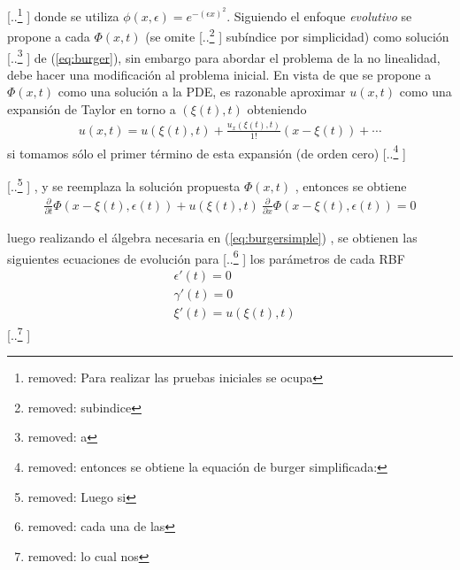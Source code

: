 \documentclass[spanish]{article} %
\providecommand{\DIFaddtex}[1]{{\protect\color{blue} \sf #1}} %
\providecommand{\DIFdeltex}[1]{{\protect\color{red} [..\footnote{removed: #1} ]}} %
\providecommand{\DIFaddbegin}{} %
\providecommand{\DIFaddend}{} %
\providecommand{\DIFdelbegin}{} %
\providecommand{\DIFdelend}{} %
\providecommand{\DIFadd}[1]{\texorpdfstring{\DIFaddtex{#1}}{#1}} %
\providecommand{\DIFdel}[1]{\texorpdfstring{\DIFdeltex{#1}}{}} %
\begin{document}
    \DIFdelbegin \DIFdel{Para realizar las pruebas iniciales se ocupa }\DIFdelend \DIFaddbegin \noindent \DIFadd{donde se utiliza }\DIFaddend $\displaystyle \phi(x,\epsilon) = e^{-(\epsilon x)^2}$. Siguiendo el enfoque \textit{evolutivo} se propone \DIFaddbegin \DIFadd{a cada }\DIFaddend $\Phi(x,t)$ (se omite \DIFdelbegin \DIFdel{subindice }\DIFdelend \DIFaddbegin \DIFadd{subíndice }\DIFaddend por simplicidad) como solución \DIFdelbegin \DIFdel{a }\DIFdelend \DIFaddbegin \DIFadd{de }\DIFaddend (\ref{eq:burger}), sin embargo para abordar el problema de la no linealidad, debe hacer una modificación al problema inicial. En vista de que se propone a $\Phi(x,t)$ como una solución a la PDE, es razonable aproximar $u(x,t)$ como una expansión de Taylor en torno a $(\xi(t),t)$ obteniendo
    \begin{align}
      u(x,t) = u(\xi(t),t) + \frac{u_x(\xi(t),t)}{1!}(x-\xi(t)) + \cdots
    \end{align}
    si tomamos sólo el primer término de esta expansión (de orden cero)\DIFdelbegin \DIFdel{entonces se obtiene la equación de burger simplificada:
    }%

\DIFdel{Luego si }\DIFdelend \DIFaddbegin \DIFadd{, y  }\DIFaddend se reemplaza la solución propuesta $\Phi(x,t)$\DIFaddbegin \DIFadd{, entonces se obtiene
    }\begin{align}
      \frac{\partial}{\partial t}\Phi(x-\xi(t),\epsilon(t)) + u(\xi(t),t)\ \frac{\partial}{\partial x}\Phi(x-\xi(t),\epsilon(t)) = 0
      \label{eq:burgersimple}
    \end{align}

    \noindent \DIFadd{luego realizando el álgebra necesaria }\DIFaddend en (\ref{eq:burgersimple})\DIFaddbegin \DIFadd{, }\DIFaddend se obtienen las siguientes ecuaciones de evolución para \DIFdelbegin \DIFdel{cada una de las }\DIFdelend \DIFaddbegin \DIFadd{los parámetros de cada }\DIFaddend RBF
    \begin{align*}
    & \epsilon'(t) = 0 \\
    & \gamma'(t) = 0  \\
    & \xi'(t) = u(\xi(t),t)
    \end{align*}
   \DIFdelbegin \DIFdel{lo cual nos }\DIFdelend \DIFaddbegin 
\end{document}
